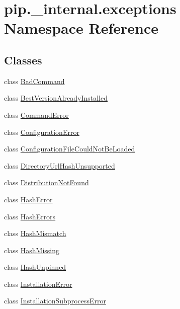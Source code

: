 \hypertarget{namespacepip_1_1__internal_1_1exceptions}{}\section{pip.\+\_\+internal.\+exceptions Namespace Reference}
\label{namespacepip_1_1__internal_1_1exceptions}
\subsection*{Classes}
\begin{DoxyCompactItemize}
\item 
class \hyperlink{classpip_1_1__internal_1_1exceptions_1_1BadCommand}{Bad\+Command}
\item 
class \hyperlink{classpip_1_1__internal_1_1exceptions_1_1BestVersionAlreadyInstalled}{Best\+Version\+Already\+Installed}
\item 
class \hyperlink{classpip_1_1__internal_1_1exceptions_1_1CommandError}{Command\+Error}
\item 
class \hyperlink{classpip_1_1__internal_1_1exceptions_1_1ConfigurationError}{Configuration\+Error}
\item 
class \hyperlink{classpip_1_1__internal_1_1exceptions_1_1ConfigurationFileCouldNotBeLoaded}{Configuration\+File\+Could\+Not\+Be\+Loaded}
\item 
class \hyperlink{classpip_1_1__internal_1_1exceptions_1_1DirectoryUrlHashUnsupported}{Directory\+Url\+Hash\+Unsupported}
\item 
class \hyperlink{classpip_1_1__internal_1_1exceptions_1_1DistributionNotFound}{Distribution\+Not\+Found}
\item 
class \hyperlink{classpip_1_1__internal_1_1exceptions_1_1HashError}{Hash\+Error}
\item 
class \hyperlink{classpip_1_1__internal_1_1exceptions_1_1HashErrors}{Hash\+Errors}
\item 
class \hyperlink{classpip_1_1__internal_1_1exceptions_1_1HashMismatch}{Hash\+Mismatch}
\item 
class \hyperlink{classpip_1_1__internal_1_1exceptions_1_1HashMissing}{Hash\+Missing}
\item 
class \hyperlink{classpip_1_1__internal_1_1exceptions_1_1HashUnpinned}{Hash\+Unpinned}
\item 
class \hyperlink{classpip_1_1__internal_1_1exceptions_1_1InstallationError}{Installation\+Error}
\item 
class \hyperlink{classpip_1_1__internal_1_1exceptions_1_1InstallationSubprocessError}{Installation\+Subprocess\+Error}

\end{DoxyCompactItemize}
